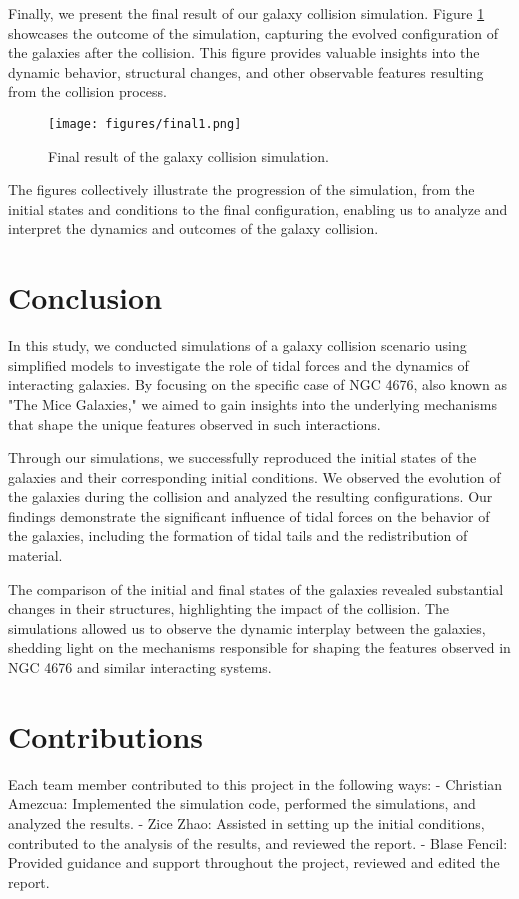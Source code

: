 \documentclass[reprint, amsmath, amssymb, aps]{revtex4-2}
\begin{document}
Finally, we present the final result of our galaxy collision simulation. Figure \ref{fig:final_result} showcases the outcome of the simulation, capturing the evolved configuration of the galaxies after the collision. This figure provides valuable insights into the dynamic behavior, structural changes, and other observable features resulting from the collision process.

\begin{figure}[htb]
\centering
\texttt{[image: figures/final1.png]}
\caption{Final result of the galaxy collision simulation.}
\label{fig:final_result}
\end{figure}

The figures collectively illustrate the progression of the simulation, from the initial states and conditions to the final configuration, enabling us to analyze and interpret the dynamics and outcomes of the galaxy collision.

\section{Conclusion}

In this study, we conducted simulations of a galaxy collision scenario using simplified models to investigate the role of tidal forces and the dynamics of interacting galaxies. By focusing on the specific case of NGC 4676, also known as "The Mice Galaxies," we aimed to gain insights into the underlying mechanisms that shape the unique features observed in such interactions.

Through our simulations, we successfully reproduced the initial states of the galaxies and their corresponding initial conditions. We observed the evolution of the galaxies during the collision and analyzed the resulting configurations. Our findings demonstrate the significant influence of tidal forces on the behavior of the galaxies, including the formation of tidal tails and the redistribution of material.

The comparison of the initial and final states of the galaxies revealed substantial changes in their structures, highlighting the impact of the collision. The simulations allowed us to observe the dynamic interplay between the galaxies, shedding light on the mechanisms responsible for shaping the features observed in NGC 4676 and similar interacting systems.

\section{Contributions}

Each team member contributed to this project in the following ways:
- Christian Amezcua: Implemented the simulation code, performed the simulations, and analyzed the results.
- Zice Zhao: Assisted in setting up the initial conditions, contributed to the analysis of the results, and reviewed the report.
- Blase Fencil: Provided guidance and support throughout the project, reviewed and edited the report.

\appendix


\end{document}
